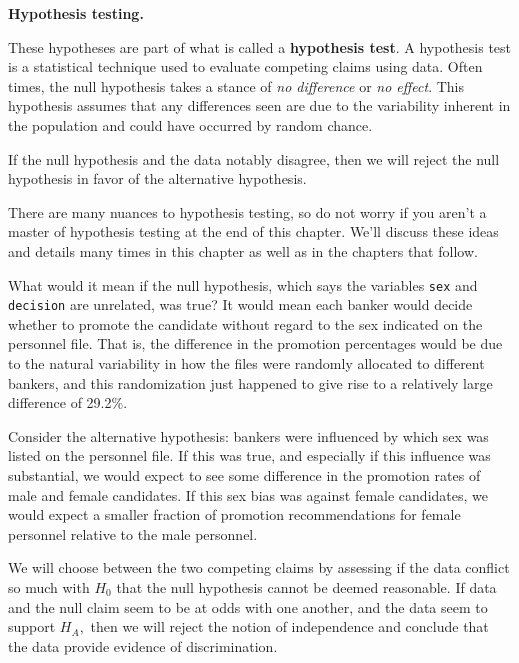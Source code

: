 \documentclass[
  10pt,
  openany]{book}
\theoremstyle{definition}
\theoremstyle{definition}
\theoremstyle{definition}
\theoremstyle{definition}
\theoremstyle{remark}
\begin{document}
\begin{onebox}
\textbf{Hypothesis testing.}

These hypotheses are part of what is called a \textbf{hypothesis test}.
A hypothesis test is a statistical technique used to evaluate competing claims using data.
Often times, the null hypothesis takes a stance of \emph{no difference} or \emph{no effect}.
This hypothesis assumes that any differences seen are due to the variability inherent in the population and could have occurred by random chance.

If the null hypothesis and the data notably disagree, then we will reject the null hypothesis in favor of the alternative hypothesis.

There are many nuances to hypothesis testing, so do not worry if you aren't a master of hypothesis testing at the end of this chapter.
We'll discuss these ideas and details many times in this chapter as well as in the chapters that follow.

\end{onebox}

What would it mean if the null hypothesis, which says the variables \texttt{sex} and \texttt{decision} are unrelated, was true?
It would mean each banker would decide whether to promote the candidate without regard to the sex indicated on the personnel file.
That is, the difference in the promotion percentages would be due to the natural variability in how the files were randomly allocated to different bankers, and this randomization just happened to give rise to a relatively large difference of 29.2\%.

Consider the alternative hypothesis: bankers were influenced by which sex was listed on the personnel file.
If this was true, and especially if this influence was substantial, we would expect to see some difference in the promotion rates of male and female candidates.
If this sex bias was against female candidates, we would expect a smaller fraction of promotion recommendations for female personnel relative to the male personnel.

We will choose between the two competing claims by assessing if the data conflict so much with \(H_0\) that the null hypothesis cannot be deemed reasonable.
If data and the null claim seem to be at odds with one another, and the data seem to support \(H_A,\) then we will reject the notion of independence and conclude that the data provide evidence of discrimination.

\vspace{-2mm}
\end{document}
